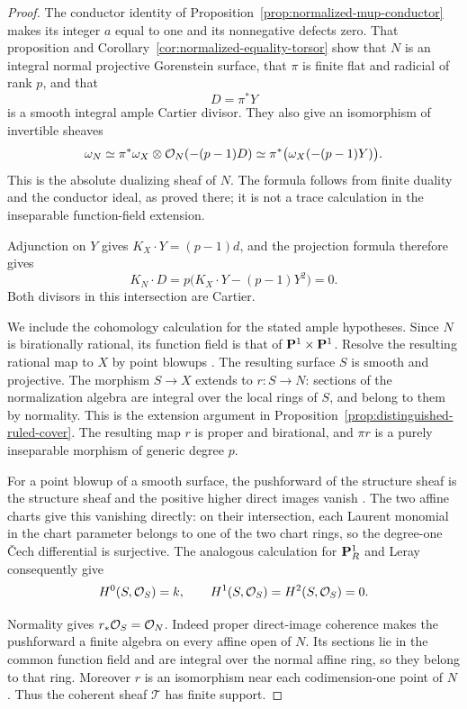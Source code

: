 \begin{proof}
The conductor identity of
Proposition~\ref{prop:normalized-mup-conductor} makes its integer
$a$ equal to one and its nonnegative defects zero.
That proposition and
Corollary~\ref{cor:normalized-equality-torsor} show that $N$ is an
integral normal projective Gorenstein surface, that $\pi$ is finite
flat and radicial of rank $p$, and that
\[
 D=\pi^*Y
\]
is a smooth integral ample Cartier divisor.
They also give an isomorphism of invertible sheaves
\[
 \omega_N\simeq
 \pi^*\omega_X\otimes\mathcal O_N(-(p-1)D)
 \simeq\pi^*\bigl(\omega_X(-(p-1)Y)\bigr).
\]
This is the absolute dualizing sheaf of $N$.
The formula follows from finite duality and the conductor ideal,
as proved there; it is not a trace calculation in the inseparable
function-field extension.

Adjunction on $Y$ gives $K_X\cdot Y=(p-1)d$, and the projection
formula therefore gives
\[
 K_N\cdot D
 =p\bigl(K_X\cdot Y-(p-1)Y^2\bigr)=0.
\]
Both divisors in this intersection are Cartier.

We include the cohomology calculation for the stated ample
hypotheses. Since $N$ is birationally rational, its function field
is that of $\mathbf P^1\times\mathbf P^1$. Resolve the resulting rational map
to $X$ by point blowups \cite[Tag~0C5H]{Stacks}.
The resulting surface $S$ is smooth and projective.
The morphism $S\to X$ extends to $r:S\to N$: sections of the
normalization algebra are integral over the local rings of $S$,
and belong to them by normality. This is the extension argument
in Proposition~\ref{prop:distinguished-ruled-cover}.
The resulting map $r$ is proper and birational, and $\pi r$ is a
purely inseparable morphism of generic degree $p$.

For a point blowup of a smooth surface, the pushforward of the
structure sheaf is the structure sheaf and the positive higher
direct images vanish \cite[Lemma~54.3.4, Tag~0AGP]{Stacks}.
The two affine charts give this vanishing directly: on their
intersection, each Laurent monomial in the chart parameter belongs
to one of the two chart rings, so the degree-one \v{C}ech
differential is surjective. The analogous calculation for
$\mathbf P^1_R$ and Leray consequently give
\[
 H^0(S,\mathcal O_S)=k,\qquad H^1(S,\mathcal O_S)=H^2(S,\mathcal O_S)=0.
\]

Normality gives $r_*\mathcal O_S=\mathcal O_N$. Indeed proper direct-image
coherence \cite[III$_1$, Theorem~3.2.1]{EGA} makes the pushforward
a finite algebra on every affine open of $N$.
Its sections lie in the common function field and are integral
over the normal affine ring, so they belong to that ring.
Moreover $r$ is an isomorphism near each codimension-one point of
$N$ \cite[Tag~0BFP]{Stacks}.
Thus the coherent sheaf $\mathcal T$ has finite support.


\end{proof}
